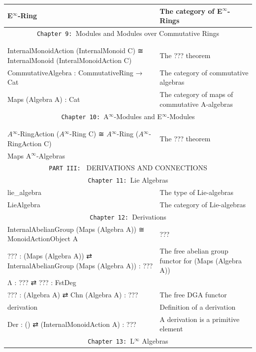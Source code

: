 \documentclass{book}
\theoremstyle{definition}
\begin{document}
{\begin{longtable}{|| l || l ||}
 \hline
E${}^{\infty}$-Ring  & The category of E${}^{\infty}$-Rings \\
 \hline \hline
\multicolumn{2}{||c||}{\texttt{Chapter 9: }Modules and Modules over Commutative Rings} \\
\hline \hline
 &  \\
 \hline
 &  \\
 \hline
InternalMonoidAction (InternalMonoid C) ≅ InternalMonoid (InteralMonoidAction C) & The ??? theorem \\ 
\hline
CommutativeAlgebra : CommutativeRing → Cat & The category of commutative algebras \\
\hline
Maps (Algebra A) : Cat & The category of maps of commutative A-algebras \\
\hline \hline
\multicolumn{2}{||c||}{\texttt{Chapter 10: }A${}^{\infty}$-Modules and E${}^{\infty}$-Modules} \\
\hline \hline
 &  \\
\hline
 &  \\
\hline
$A{}^{\infty}$-RingAction ($A{}^{\infty}$-Ring C) ≅ $A{}^{\infty}$-Ring ($A{}^{\infty}$-RingAction C) & The ??? theorem \\ 
\hline
Maps A${}^{\infty}$-Algebras & \\
 \hline \hline
\multicolumn{2}{||c||}{\texttt{PART III: } DERIVATIONS AND CONNECTIONS} \\
\hline \hline
\multicolumn{2}{||c||}{\texttt{Chapter 11: }Lie Algebras} \\
\hline \hline
lie\_algebra & The type of Lie-algebras \\
\hline
LieAlgebra & The category of Lie-algebras \\
\hline \hline
\multicolumn{2}{||c||}{\texttt{Chapter 12: }Derivations} \\
\hline \hline
InternalAbelianGroup (Maps (Algebra A)) ≅ MonoidActionObject A & ??? \\
\hline
??? : (Maps (Algebra A)) ⇄ InternalAbelianGroup (Maps (Algebra A)) : ??? & The free abelian group functor for (Maps (Algebra A)) \\
\hline
Λ : ??? ⇄ ??? : FstDeg & \\ 
\hline
??? : (Algebra A) ⇄ Chn (Algebra A) : ??? & The free DGA functor \\
\hline 
derivation & Definition of a derivation \\
\hline
Der : () ⇄ (InternalMonoidAction A) : ??? & A derivation is a primitive element \\
\hline \hline
\multicolumn{2}{||c||}{\texttt{Chapter 13: }L${}^{\infty}$ Algebras} \\

\end{longtable}}
\end{document}
